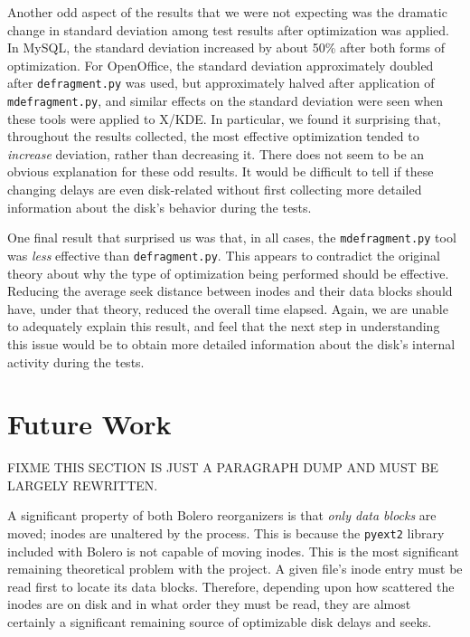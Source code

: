\documentclass[10pt,twocolumn,letterpaper]{article}
\begin{document}
Another odd aspect of the results that we were not expecting was the dramatic change in standard deviation among test results after optimization was applied. In MySQL, the standard deviation increased by about 50\% after both forms of optimization. For OpenOffice, the standard deviation approximately doubled after \texttt{defragment.py} was used, but approximately halved after application of \texttt{mdefragment.py}, and similar effects on the standard deviation were seen when these tools were applied to X/KDE. In particular, we found it surprising that, throughout the results collected, the most effective optimization tended to \emph{increase} deviation, rather than decreasing it. There does not seem to be an obvious explanation for these odd results. It would be difficult to tell if these changing delays are even disk-related without first collecting more detailed information about the disk's behavior during the tests.

One final result that surprised us was that, in all cases, the \texttt{mdefragment.py} tool was \emph{less} effective than \texttt{defragment.py}. This appears to contradict the original theory about why the type of optimization being performed should be effective. Reducing the average seek distance between inodes and their data blocks should have, under that theory, reduced the overall time elapsed. Again, we are unable to adequately explain this result, and feel that the next step in understanding this issue would be to obtain more detailed information about the disk's internal activity during the tests.

\section{Future Work}\label{sec:future}

FIXME THIS SECTION IS JUST A PARAGRAPH DUMP AND MUST BE LARGELY REWRITTEN.

A significant property of both Bolero reorganizers is that \emph{only data blocks} are moved; inodes are
unaltered by the process. This is because the \texttt{pyext2} library included with Bolero is not capable of moving inodes. This is the most significant remaining theoretical problem with the project. A given file's inode entry must be read first to locate its data blocks. Therefore, depending upon how scattered the inodes are on disk and in what order they must be read, they are almost certainly a significant remaining source of optimizable disk delays and seeks.
\end{document}
